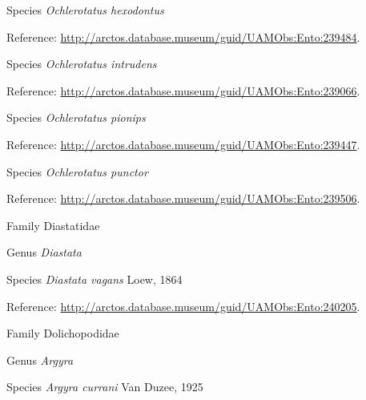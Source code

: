 \documentclass[9pt, article]{memoir}
\begin{document}
\begin{multicols}{2}
\vspace{6pt}\noindent\hspace{36pt}Species \textit{Ochlerotatus hexodontus}


\vspace{6pt}Reference: 
\url{http://arctos.database.museum/guid/UAMObs:Ento:239484}.

\vspace{6pt}\noindent\hspace{36pt}Species \textit{Ochlerotatus intrudens}


\vspace{6pt}Reference: 
\url{http://arctos.database.museum/guid/UAMObs:Ento:239066}.

\vspace{6pt}\noindent\hspace{36pt}Species \textit{Ochlerotatus pionips}


\vspace{6pt}Reference: 
\url{http://arctos.database.museum/guid/UAMObs:Ento:239447}.

\vspace{6pt}\noindent\hspace{36pt}Species \textit{Ochlerotatus punctor}


\vspace{6pt}Reference: 
\url{http://arctos.database.museum/guid/UAMObs:Ento:239506}.

\vspace{6pt}\noindent\hspace{24pt}Family Diastatidae


\vspace{6pt}\noindent\hspace{30pt}Genus \textit{Diastata}


\vspace{6pt}\noindent\hspace{36pt}Species \textit{Diastata vagans} Loew, 1864


\vspace{6pt}Reference: 
\url{http://arctos.database.museum/guid/UAMObs:Ento:240205}.

\vspace{6pt}\noindent\hspace{24pt}Family Dolichopodidae


\vspace{6pt}\noindent\hspace{30pt}Genus \textit{Argyra}


\vspace{6pt}\noindent\hspace{36pt}Species \textit{Argyra currani} Van Duzee, 1925



\end{multicols}
\end{document}
